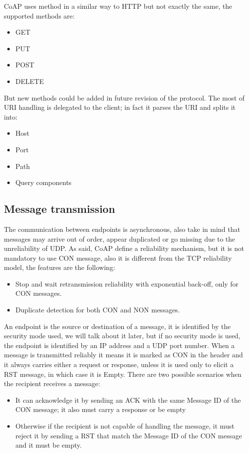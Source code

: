 	CoAP uses method in a similar way to HTTP but not exactly the same, the supported methods are: \newline
	\begin{itemize}
		\item GET
		\item PUT
		\item POST
		\item DELETE
	\end{itemize}
	But new methods could be added in future revision of the protocol.\newline
	The most of URI handling is delegated to the client; in fact it parses the URI and splits it into:\newline
	\begin{itemize}
		\item Host
		\item Port
		\item Path
		\item Query components
	\end{itemize}

	\subsection{Message transmission}
	The communication between endpoints is asynchronous, also take in mind that messages may arrive out of order, appear duplicated or
	go missing due to the unreliability of UDP.\newline
	As said, CoAP define a reliability mechanism, but it is not mandatory to use CON message, also it is different from the TCP
	reliability model, the features are the following:\newline
	\begin{itemize}
		\item Stop and wait retransmission reliability with exponential back-off, only for CON messages.
		\item Duplicate detection for both CON and NON messages.
	\end{itemize}

	An endpoint is the source or destination of a message, it is identified by the security mode used, we will talk about it later, but
	if no security mode is used, the endpoint is identified by an IP address and a UDP port number.\newline
	When a message is transmitted reliably it means it is marked as CON in the header and it always carries either a request or
	response, unless it is used only to elicit a RST message, in which case it is Empty.\newline
	There are two possible scenarios when the recipient receives a message:\newline
		\begin{itemize}
		\item It can acknowledge it by sending an ACK with the same Message ID of the CON message; it also must carry a response or be empty
		\item Otherwise if the recipient is not capable of handling the message, it must reject it by sending a RST that match the Message ID of the CON message and it must be empty.
	\end{itemize}

